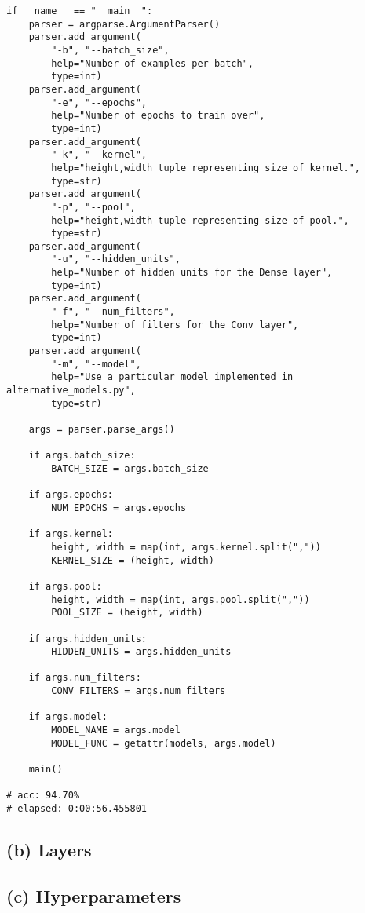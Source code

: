 \documentclass{article}[11pt]
\begin{document}
\begin{verbatim}
if __name__ == "__main__":
    parser = argparse.ArgumentParser()
    parser.add_argument(
        "-b", "--batch_size",
        help="Number of examples per batch",
        type=int)
    parser.add_argument(
        "-e", "--epochs",
        help="Number of epochs to train over",
        type=int)
    parser.add_argument(
        "-k", "--kernel",
        help="height,width tuple representing size of kernel.",
        type=str)
    parser.add_argument(
        "-p", "--pool",
        help="height,width tuple representing size of pool.",
        type=str)
    parser.add_argument(
        "-u", "--hidden_units",
        help="Number of hidden units for the Dense layer",
        type=int)
    parser.add_argument(
        "-f", "--num_filters",
        help="Number of filters for the Conv layer",
        type=int)
    parser.add_argument(
        "-m", "--model",
        help="Use a particular model implemented in alternative_models.py",
        type=str)

    args = parser.parse_args()

    if args.batch_size:
        BATCH_SIZE = args.batch_size

    if args.epochs:
        NUM_EPOCHS = args.epochs
    
    if args.kernel:
        height, width = map(int, args.kernel.split(","))
        KERNEL_SIZE = (height, width)

    if args.pool:
        height, width = map(int, args.pool.split(","))
        POOL_SIZE = (height, width)
    
    if args.hidden_units:
        HIDDEN_UNITS = args.hidden_units
    
    if args.num_filters:
        CONV_FILTERS = args.num_filters

    if args.model:
        MODEL_NAME = args.model
        MODEL_FUNC = getattr(models, args.model)

    main()

# acc: 94.70%
# elapsed: 0:00:56.455801
\end{verbatim}

\subsection*{(b) Layers}


\subsection*{(c) Hyperparameters}
\end{document}
